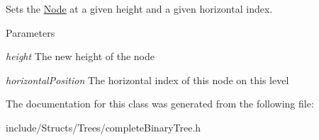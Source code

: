 Sets the \hyperlink{class_complete_binary_tree_1_1_node}{Node} at a given height and a given horizontal index. 


\begin{DoxyParams}{Parameters}
\item[{\em height}]The new height of the node \item[{\em horizontalPosition}]The horizontal index of this node on this level \end{DoxyParams}


The documentation for this class was generated from the following file:\begin{DoxyCompactItemize}
\item 
include/Structs/Trees/completeBinaryTree.h\end{DoxyCompactItemize}
